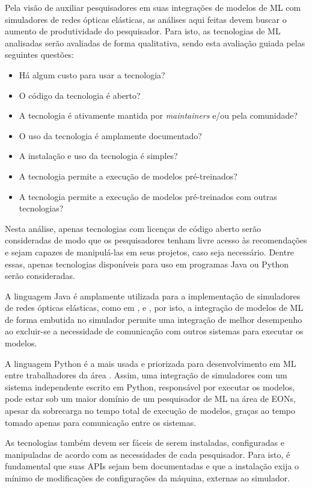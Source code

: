 Pela visão de auxiliar pesquisadores em suas integrações de modelos de ML com simuladores de redes ópticas elásticas, as análises aqui feitas devem buscar o aumento de produtividade do pesquisador. Para isto, as tecnologias de ML analisadas serão avaliadas de forma qualitativa, sendo esta avaliação guiada pelas seguintes questões:

\begin{itemize}
  \item Há algum custo para usar a tecnologia?
  \item O código da tecnologia é aberto?
  \item A tecnologia é ativamente mantida por \textit{maintainers} e/ou pela comunidade?
  \item O uso da tecnologia é amplamente documentado?
  \item A instalação e uso da tecnologia é simples?
  \item A tecnologia permite a execução de modelos pré-treinados?
  \item A tecnologia permite a execução de modelos pré-treinados com outras tecnologias?
\end{itemize}

Nesta análise, apenas tecnologias com licenças de código aberto serão consideradas de modo que os pesquisadores tenham livre acesso às recomendações e sejam capazes de manipulá-las em seus projetos, caso seja necessário. Dentre essas, apenas tecnologias disponíveis para uso em programas Java ou Python serão consideradas.

A linguagem Java é amplamente utilizada para a implementação de simuladores de redes ópticas elásticas, como em \cite{costa2016ons}, \cite{ceons2015} e \cite{net2plan}, por isto, a integração de modelos de ML de forma embutida no simulador permite uma integração de melhor desempenho ao excluir-se a necessidade de comunicação com outros sistemas para executar os modelos.

A linguagem Python é a mais usada e priorizada para desenvolvimento em ML entre trabalhadores da área \cite{developer_nation_q1_2017}. Assim, uma integração de simuladores com um sistema independente escrito em Python, responsável por executar os modelos, pode estar sob um maior domínio de um pesquisador de ML na área de EONs, apesar da sobrecarga no tempo total de execução de modelos, graças ao tempo tomado apenas para comunicação entre os sistemas.

As tecnologias também devem ser fáceis de serem instaladas, configuradas e manipuladas de acordo com as necessidades de cada pesquisador. Para isto, é fundamental que suas \acrshort{API}s sejam bem documentadas e que a instalação exija o mínimo de modificações de configurações da máquina, externas ao simulador.

